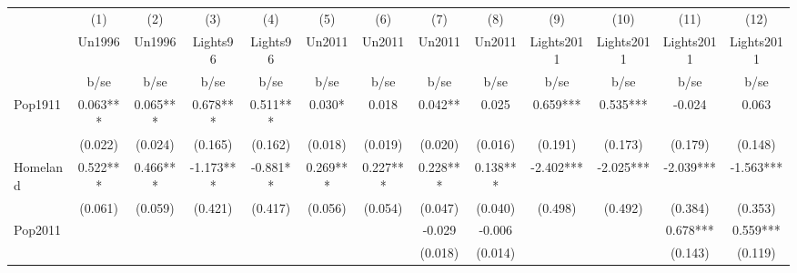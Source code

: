 {
\def\sym#1{\ifmmode^{#1}\else\(^{#1}\)\fi}
\begin{tabular}{l*{12}{c}}
\hline\hline
                    &\multicolumn{1}{c}{(1)}&\multicolumn{1}{c}{(2)}&\multicolumn{1}{c}{(3)}&\multicolumn{1}{c}{(4)}&\multicolumn{1}{c}{(5)}&\multicolumn{1}{c}{(6)}&\multicolumn{1}{c}{(7)}&\multicolumn{1}{c}{(8)}&\multicolumn{1}{c}{(9)}&\multicolumn{1}{c}{(10)}&\multicolumn{1}{c}{(11)}&\multicolumn{1}{c}{(12)}\\
                    &\multicolumn{1}{c}{Un1996}&\multicolumn{1}{c}{Un1996}&\multicolumn{1}{c}{Lights96}&\multicolumn{1}{c}{Lights96}&\multicolumn{1}{c}{Un2011}&\multicolumn{1}{c}{Un2011}&\multicolumn{1}{c}{Un2011}&\multicolumn{1}{c}{Un2011}&\multicolumn{1}{c}{Lights2011}&\multicolumn{1}{c}{Lights2011}&\multicolumn{1}{c}{Lights2011}&\multicolumn{1}{c}{Lights2011}\\
                    &        b/se   &        b/se   &        b/se   &        b/se   &        b/se   &        b/se   &        b/se   &        b/se   &        b/se   &        b/se   &        b/se   &        b/se   \\
\hline
Pop1911             &       0.063***&       0.065***&       0.678***&       0.511***&       0.030*  &       0.018   &       0.042** &       0.025   &       0.659***&       0.535***&      -0.024   &       0.063   \\
                    &     (0.022)   &     (0.024)   &     (0.165)   &     (0.162)   &     (0.018)   &     (0.019)   &     (0.020)   &     (0.016)   &     (0.191)   &     (0.173)   &     (0.179)   &     (0.148)   \\
Homeland            &       0.522***&       0.466***&      -1.173***&      -0.881** &       0.269***&       0.227***&       0.228***&       0.138***&      -2.402***&      -2.025***&      -2.039***&      -1.563***\\
                    &     (0.061)   &     (0.059)   &     (0.421)   &     (0.417)   &     (0.056)   &     (0.054)   &     (0.047)   &     (0.040)   &     (0.498)   &     (0.492)   &     (0.384)   &     (0.353)   \\
Pop2011             &               &               &               &               &               &               &      -0.029   &      -0.006   &               &               &       0.678***&       0.559***\\
                    &               &               &               &               &               &               &     (0.018)   &     (0.014)   &               &               &     (0.143)   &     (0.119)   \\

\end{tabular}}
